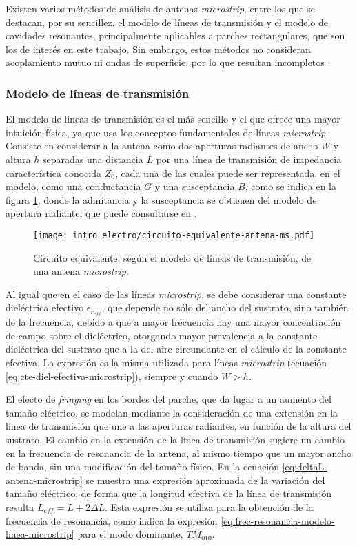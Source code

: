 Existen varios métodos de análisis de antenas \textit{microstrip}, entre los que se destacan, por su sencillez, el modelo de líneas de transmisión y el modelo de cavidades resonantes, principalmente aplicables a parches rectangulares, que son los de interés en este trabajo. Sin embargo, estos métodos no consideran acoplamiento mutuo ni ondas de superficie, por lo que resultan incompletos \cite{Pozar:InputImpedanceMutualCoupling}.
\subsubsection{Modelo de líneas de transmisión}
\label{subsubsec_microstrip_modeloLineas}
El modelo de líneas de transmisión es el más sencillo y el que ofrece una mayor intuición física, ya que usa los conceptos fundamentales de líneas \textit{microstrip}. Consiste en considerar a la antena como dos aperturas radiantes de ancho $W$ y altura $h$ separadas una distancia $L$ por una línea de transmisión de impedancia característica conocida $Z_0$, cada una de las cuales puede ser representada, en el modelo, como una conductancia $G$ y una susceptancia $B$, como se indica en la figura \ref{fig:circuito-equivalente-antena-ms}, donde la admitancia y la susceptancia se obtienen del modelo de apertura radiante, que puede consultarse en \cite{Balanis:Theory}.

\begin{figure}[htp]
	\centering
	\texttt{[image: intro\_electro/circuito-equivalente-antena-ms.pdf]}
	\caption{Circuito equivalente, según el modelo de líneas de transmisión, de una antena \textit{microstrip}.}
	\label{fig:circuito-equivalente-antena-ms}
\end{figure}



Al igual que en el caso de las líneas \textit{microstrip}, se debe considerar una constante dieléctrica efectivo $\epsilon_{r_{eff}}$, que depende no sólo del ancho del sustrato, sino también de la frecuencia, debido a que a mayor frecuencia hay una mayor concentración de campo sobre el dieléctrico, otorgando mayor prevalencia a la constante dieléctrica del sustrato que a la del aire circundante en el cálculo de la constante efectiva. La expresión es la misma utilizada para líneas \textit{microstrip} (ecuación \ref{eq:cte-diel-efectiva-microstrip}), siempre y cuando $W>h$.

El efecto de \textit{fringing} en los bordes del parche, que da lugar a un aumento del tamaño eléctrico, se modelan mediante la consideración de una extensión en la línea de transmisión que une a las aperturas radiantes, en función de la altura del sustrato. El cambio en la extensión de la línea de transmisión sugiere un cambio en la frecuencia de resonancia de la antena, al mismo tiempo que un mayor ancho de banda, sin una modificación del tamaño físico. En la ecuación \ref{eq:deltaL-antena-microstrip} se muestra una expresión aproximada de la variación del tamaño eléctrico, de forma que la longitud efectiva de la línea de transmisión resulta $L_{eff} = L + 2 \Delta L$. Esta expresión se utiliza para la obtención de la frecuencia de resonancia, como indica la expresión \ref{eq:frec-resonancia-modelo-linea-microstrip} para el modo dominante, $TM_{010}$.

